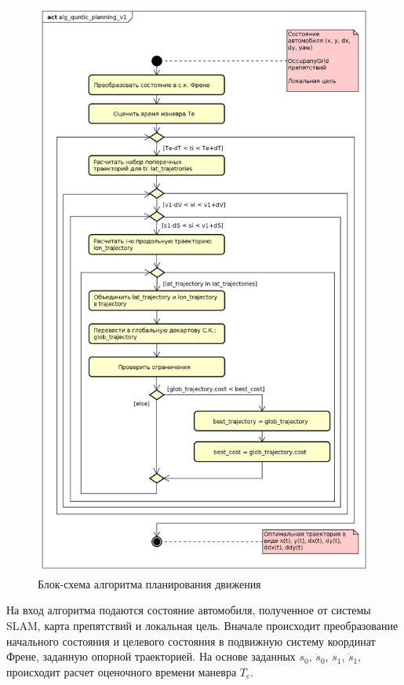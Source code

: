 \begin{figure}[p]
      \centering
      \includegraphics[height=0.95\textheight]{images/alg_quntic_planning_v1}
      \caption{Блок-схема алгоритма планирования движения}
      \label{img:alg_quntic_planning_1}
\end{figure}

На вход алгоритма подаются состояние автомобиля, полученное от системы SLAM, карта препятствий и локальная цель.
Вначале происходит преобразование начального состояния и целевого состояния в подвижную систему координат Френе,
заданную опорной траекторией. На основе заданных $s_0$, $\dot{s}_0$, $s_1$, $\dot{s}_1$, происходит расчет оценочного
времени маневра $T_e$.

